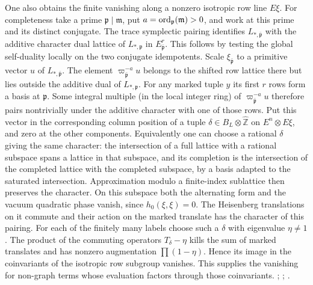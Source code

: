 One also obtains the finite vanishing along a nonzero isotropic
row line \(E\xi\). For completeness take a prime
\(\mathfrak p\mid\mathfrak m\), put \(a={\rm ord}_{\mathfrak p}
(\mathfrak m)>0\), and work at this prime and its distinct conjugate.
The trace symplectic pairing identifies \(L_{*,\bar{\mathfrak p}}\)
with the additive character dual lattice of \(L_{*,\mathfrak p}\)
in \(E_{\bar{\mathfrak p}}^r\). This follows by testing the
global self-duality locally on the two conjugate idempotents.
Scale \(\xi_{\bar{\mathfrak p}}\) to a primitive vector \(u\)
of \(L_{*,\bar{\mathfrak p}}\). The element
\(\varpi_{\bar{\mathfrak p}}^{-a}u\) belongs to the shifted row
lattice there but lies outside the additive dual of \(L_{*,\mathfrak p}\).
For any marked tuple \(y\) its first \(r\) rows form a basis at
\(\mathfrak p\). Some integral multiple (in the local integer
ring) of \(\varpi_{\bar{\mathfrak p}}^{-a}u\) therefore pairs
nontrivially under the additive character with one of those rows.
Put this vector in the corresponding column position of a tuple
\(\delta\in B_L\otimes\widehat{\mathbb Z}\) on \(E^n\otimes E\xi\),
and zero at the other components. Equivalently one can choose a
rational \(\delta\) giving the same character: the intersection of
a full lattice with a rational subspace spans a lattice in that
subspace, and its completion is the intersection of the completed
lattice with the completed subspace, by a basis adapted to the
saturated intersection. Approximation modulo a finite-index
sublattice then preserves the character.
On this subspace both the alternating form and the vacuum quadratic
phase vanish, since \(h_0(\xi,\xi)=0\). The Heisenberg translations
on it commute and their action on the marked translate has the
character of this pairing. For each of the finitely many labels
choose such a \(\delta\) with eigenvalue \(\eta\ne1\). The product
of the commuting operators \(T_\delta-\eta\) kills the sum of
marked translates and has nonzero augmentation
\(\prod(1-\eta)\). Hence its image in the coinvariants of the
isotropic row subgroup vanishes. This supplies the vanishing for
non-graph terms whose evaluation factors through those coinvariants.
;
;
.

